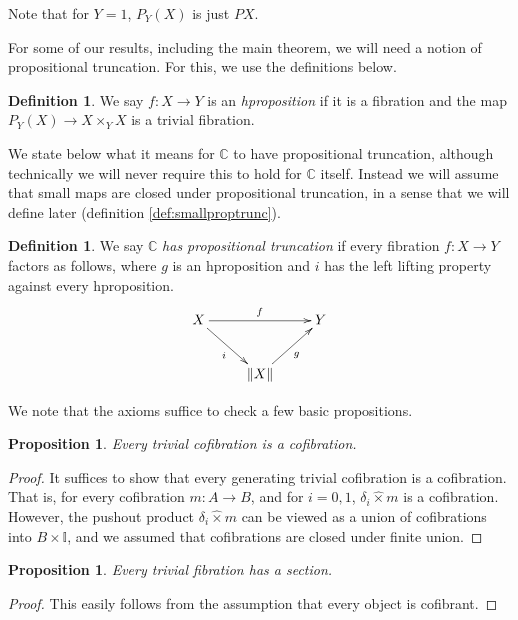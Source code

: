 \documentclass[a4paper]{amsart}
\newtheorem{proposition}[theorem]{Proposition}
\theoremstyle{definition}
\newtheorem{definition}[theorem]{Definition}
\newcommand{\cat}[1]{\mathbb{#1}}
\newcommand{\catc}{\cat{C}}
\newcommand{\intv}{\mathbb{I}}
\begin{document}
Note that for $Y = 1$, $P_Y(X)$ is just $P X$.

For some of our results, including the main theorem, we will need a
notion of propositional truncation. For this, we use the definitions
below.
\begin{definition}
  We say $f \colon X \to Y$ is an \emph{hproposition} if it is a
  fibration and the map $P_Y(X) \to X \times_Y X$ is a trivial
  fibration.
\end{definition}

We state below what it means for $\catc$ to have propositional
truncation, although technically we will never require this to hold
for $\catc$ itself. Instead we will assume that small maps are closed
under propositional truncation, in a sense that we will define later
(definition \ref{def:smallproptrunc}).
\begin{definition}
  We say $\catc$ \emph{has propositional truncation} if every fibration
  $f \colon X \to Y$ factors as follows, where $g$ is an
  hproposition and $i$ has the left lifting property against every
  hproposition.
  \begin{equation*}
    \xymatrix{ X \ar[rr]^f \ar[dr]_i & & Y \\
      & \| X \| \ar[ur]_g &}
  \end{equation*}
\end{definition}

We note that the axioms suffice to check a few basic propositions.
\begin{proposition}
  Every trivial cofibration is a cofibration.
\end{proposition}

\begin{proof}
  It suffices to show that every generating trivial cofibration is a
  cofibration. That is, for every cofibration $m \colon A \to B$, and
  for $i = 0, 1$, $\delta_i \hat{\times} m$ is a cofibration. However,
  the pushout product $\delta_i \hat{\times} m$ can be viewed as a
  union of cofibrations into $B \times \intv$, and we assumed that
  cofibrations are closed under finite union.
\end{proof}

\begin{proposition}
  Every trivial fibration has a section.
\end{proposition}

\begin{proof}
  This easily follows from the assumption that every object is
  cofibrant.
\end{proof}
\end{document}
